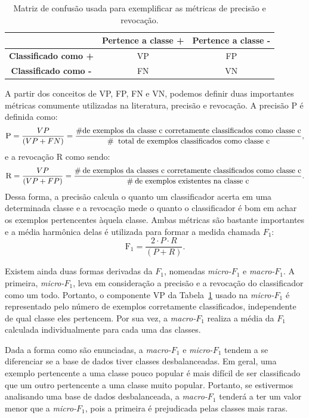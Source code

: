 \begin{table}[ht*]
\centering
\caption{Matriz de confusão usada para exemplificar as métricas de precisão e revocação.}
\begin{tabular}{|c|c|c|}
\toprule
       &    \textbf{Pertence a classe +} & \textbf{Pertence a classe -} \\
\midrule
    \textbf{Classificado como +}  & VP & FP \tabularnewline \hline
    \textbf{Classificado como -}  & FN & VN \tabularnewline
\bottomrule
\end{tabular}
\label{table::confusao}
\end{table}

A partir dos conceitos de VP, FP, FN e VN, podemos definir duas importantes métricas comumente utilizadas na literatura, precisão e revocação. A precisão \textsc{P} é definida como:
\begin{equation}
\textsc{P} = \frac{VP}{(VP+FN)} = \frac{\# \text{de exemplos da classe c corretamente classificados como classe c}} {\# \: \text{ total de exemplos classificados como classe c}} \\,
\end{equation}
e a revocação \textsc{R} como sendo:
\begin{equation}
\textsc{R} = \frac{VP}{(VP+FP)} = \frac{\# \: \text{de exemplos da classes c corretamente classificados como classe c}}{\# \: \text{de exemplos existentes na classe c}}.
\end{equation}
Dessa forma, a precisão calcula o quanto um classificador acerta em uma determinada classe e a revocação mede o quanto o classificador é bom em achar os exemplos pertencentes àquela classe.
Ambas métricas são bastante importantes e a média harmônica delas é utilizada para formar a medida chamada $F_1$:
\begin{equation}
\text{F}_1 = \frac{2 \cdot P \cdot R}{(P + R)}.
\end{equation}

Existem ainda duas formas derivadas da $F_1$, nomeadas \textit{micro-$F_1$} e \textit{macro-$F_1$}. A primeira, \textit{micro-$F_1$}, leva em consideração a precisão e a revocação do classificador como um todo. 
Portanto, o componente VP da Tabela~\ref{table::confusao} usado na \textit{micro-$F_1$} é representado pelo número de exemplos corretamente classificados, independente de qual classe eles pertencem.
Por sua vez, a \textit{macro-$F_1$} realiza a média da $F_1$ calculada individualmente para cada uma das classes. 

Dada a forma como são enunciadas, a \textit{macro-$F_1$} e \textit{micro-$F_1$} tendem a se diferenciar se a base de dados tiver classes desbalanceadas. Em geral, uma exemplo pertencente a uma classe pouco popular é mais difícil de ser classificado que um outro pertencente a uma classe muito popular. Portanto, se estivermos analisando uma base de dados desbalanceada, a \textit{macro-$F_1$} tenderá a ter um valor menor que a \textit{micro-$F_1$}, pois a primeira é prejudicada pelas classes mais raras. 

